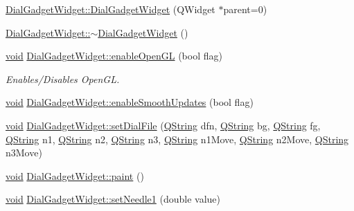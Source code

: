 \begin{DoxyCompactItemize}
\hyperlink{group___dial_plugin_gac5397a4cc992266439aa3e8b1513c209}{\-Dial\-Gadget\-Widget\-::\-Dial\-Gadget\-Widget} (\-Q\-Widget $\ast$parent=0)
\item 
\hyperlink{group___dial_plugin_ga3e34cc3b776a627597b4c4823b358741}{\-Dial\-Gadget\-Widget\-::$\sim$\-Dial\-Gadget\-Widget} ()
\item 
\hyperlink{group___u_a_v_objects_plugin_ga444cf2ff3f0ecbe028adce838d373f5c}{void} \hyperlink{group___dial_plugin_gaad3e246709ada936d97644f6e87fba59}{\-Dial\-Gadget\-Widget\-::enable\-Open\-G\-L} (bool flag)
\begin{DoxyCompactList}\small\item\em \-Enables/\-Disables \-Open\-G\-L. \end{DoxyCompactList}\item 
\hyperlink{group___u_a_v_objects_plugin_ga444cf2ff3f0ecbe028adce838d373f5c}{void} \hyperlink{group___dial_plugin_ga6b6e527e9c2516f6dec2f6332a288a9f}{\-Dial\-Gadget\-Widget\-::enable\-Smooth\-Updates} (bool flag)
\item 
\hyperlink{group___u_a_v_objects_plugin_ga444cf2ff3f0ecbe028adce838d373f5c}{void} \hyperlink{group___dial_plugin_ga00bc4e8b1988a13cf8d1fff889444684}{\-Dial\-Gadget\-Widget\-::set\-Dial\-File} (\hyperlink{group___u_a_v_objects_plugin_gab9d252f49c333c94a72f97ce3105a32d}{\-Q\-String} dfn, \hyperlink{group___u_a_v_objects_plugin_gab9d252f49c333c94a72f97ce3105a32d}{\-Q\-String} bg, \hyperlink{group___u_a_v_objects_plugin_gab9d252f49c333c94a72f97ce3105a32d}{\-Q\-String} fg, \hyperlink{group___u_a_v_objects_plugin_gab9d252f49c333c94a72f97ce3105a32d}{\-Q\-String} n1, \hyperlink{group___u_a_v_objects_plugin_gab9d252f49c333c94a72f97ce3105a32d}{\-Q\-String} n2, \hyperlink{group___u_a_v_objects_plugin_gab9d252f49c333c94a72f97ce3105a32d}{\-Q\-String} n3, \hyperlink{group___u_a_v_objects_plugin_gab9d252f49c333c94a72f97ce3105a32d}{\-Q\-String} n1\-Move, \hyperlink{group___u_a_v_objects_plugin_gab9d252f49c333c94a72f97ce3105a32d}{\-Q\-String} n2\-Move, \hyperlink{group___u_a_v_objects_plugin_gab9d252f49c333c94a72f97ce3105a32d}{\-Q\-String} n3\-Move)
\item 
\hyperlink{group___u_a_v_objects_plugin_ga444cf2ff3f0ecbe028adce838d373f5c}{void} \hyperlink{group___dial_plugin_gab6b769564974c0549228d13820ced8e7}{\-Dial\-Gadget\-Widget\-::paint} ()
\item 
\hyperlink{group___u_a_v_objects_plugin_ga444cf2ff3f0ecbe028adce838d373f5c}{void} \hyperlink{group___dial_plugin_gaab89c42817209c3b41a9f407138b2c2f}{\-Dial\-Gadget\-Widget\-::set\-Needle1} (double value)

\end{DoxyCompactItemize}
